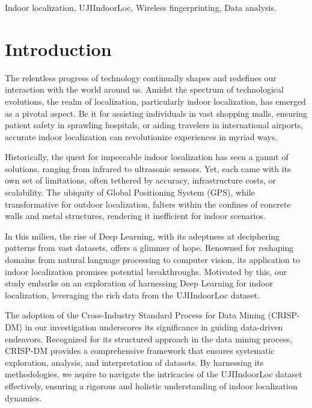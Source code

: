 \documentclass[conference]{IEEEtran}
\begin{document}
\begin{IEEEkeywords}
Indoor localization, UJIIndoorLoc, Wireless fingerprinting, Data analysis.
\end{IEEEkeywords}

\maketitle


\section{Introduction}
The relentless progress of technology continually shapes and redefines our interaction with the world around us. Amidst the spectrum of technological evolutions, the realm of localization, particularly indoor localization, has emerged as a pivotal aspect. Be it for assisting individuals in vast shopping malls, ensuring patient safety in sprawling hospitals, or aiding travelers in international airports, accurate indoor localization can revolutionize experiences in myriad ways.

Historically, the quest for impeccable indoor localization has seen a gamut of solutions, ranging from infrared to ultrasonic sensors. Yet, each came with its own set of limitations, often tethered by accuracy, infrastructure costs, or scalability. The ubiquity of Global Positioning System (GPS), while transformative for outdoor localization, falters within the confines of concrete walls and metal structures, rendering it inefficient for indoor scenarios\textcolor{blue}{\cite{zhang2013comprehensive}}.

In this milieu, the rise of Deep Learning, with its adeptness at deciphering patterns from vast datasets, offers a glimmer of hope. Renowned for reshaping domains from natural language processing to computer vision, its application to indoor localization promises potential breakthroughs\textcolor{blue}{\cite{alsheikh2015deep}}. Motivated by this, our study embarks on an exploration of harnessing Deep Learning for indoor localization, leveraging the rich data from the UJIIndoorLoc dataset.

The adoption of the Cross-Industry Standard Process for Data Mining (CRISP-DM) in our investigation underscores its significance in guiding data-driven endeavors. Recognized for its structured approach in the data mining process, CRISP-DM provides a comprehensive framework that ensures systematic exploration, analysis, and interpretation of datasets. By harnessing its methodologies, we aspire to navigate the intricacies of the UJIIndoorLoc dataset effectively, ensuring a rigorous and holistic understanding of indoor localization dynamics.
\end{document}
